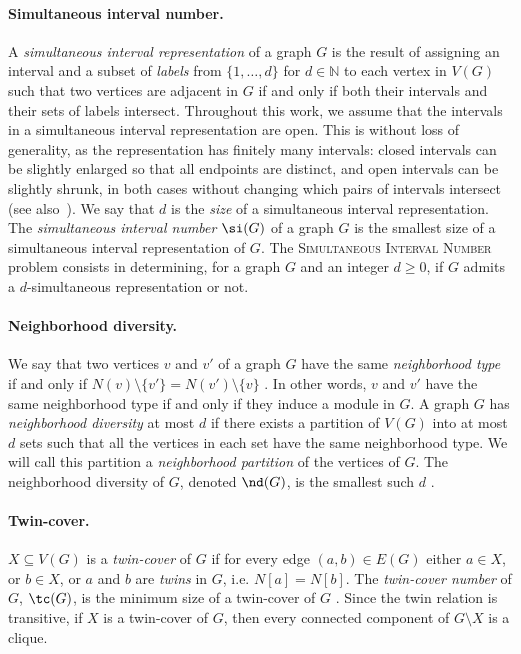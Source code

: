 \documentclass[11pt]{article}
\theoremstyle{plain}
\theoremstyle{definition}
\theoremstyle{remark}
\newcommand{\N}{\mathbb{N}}
\begin{document}
\paragraph{Simultaneous interval number.} A \emph{simultaneous interval representation} of a graph $G$ is the result of assigning an interval and a subset of \emph{labels} from $\{1,\dots,d\}$ for $d \in \N$ to each vertex in $V(G)$ such that two vertices are adjacent in $G$ if and only if both their intervals and their sets of labels intersect. Throughout this work, we assume that the intervals in a simultaneous interval representation are open. This is without loss of generality, as the representation has finitely many intervals: closed intervals can be slightly enlarged so that all endpoints are distinct, and open intervals can be slightly shrunk, in both cases without changing which pairs of intervals intersect (see also~\citet{open-closed-interval-graphs}). We say that $d$ is the \emph{size} of a simultaneous interval representation. The \emph{simultaneous interval number} $\si(G)$ of a graph $G$ is the smallest size of a simultaneous interval representation of $G$. The \textsc{Simultaneous Interval Number} problem consists in determining, for a graph $G$ and an integer $d \geq 0$, if $G$ admits a $d$-simultaneous representation or not.

\paragraph{Neighborhood diversity.} We say that two vertices $v$ and $v'$ of a graph $G$ have the same \emph{neighborhood type} if and only if $N(v) \setminus \{v'\} = N(v') \setminus \{v\}$ \citep[Definition 1]{neighborhood-diversity}. In other words, $v$ and $v'$ have the same neighborhood type if and only if they induce a module in $G$. A graph $G$ has \emph{neighborhood diversity} at most $d$ if there exists a partition of $V(G)$ into at most $d$ sets such that all the vertices in each set have the same neighborhood type. We will call this partition a \emph{neighborhood partition} of the vertices of $G$. The neighborhood diversity of $G$, denoted $\nd(G)$, is the smallest such $d$ \citep[Definition 2]{neighborhood-diversity}.

\paragraph{Twin-cover.} $X \subseteq V(G)$ is a \emph{twin-cover} of $G$ if for every edge $(a,b) \in E(G)$ either $a \in X$, or $b \in X$, or $a$ and $b$ are \emph{twins} in $G$, i.e. $N[a]=N[b]$. The \emph{twin-cover number} of $G$, $\tc(G)$, is the minimum size of a twin-cover of $G$ \citep[Definition 3.1]{twin-cover}. Since the twin relation is transitive, if $X$ is a twin-cover of $G$, then every connected component of $G \setminus X$ is a clique.
\end{document}
